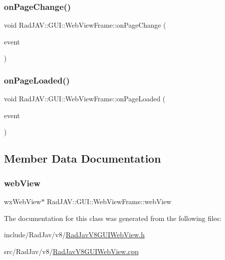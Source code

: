 \subsubsection{\texorpdfstring{on\+Page\+Change()}{onPageChange()}}
{\footnotesize\ttfamily void Rad\+J\+A\+V\+::\+G\+U\+I\+::\+Web\+View\+Frame\+::on\+Page\+Change (\begin{DoxyParamCaption}\item[{wx\+Web\+View\+Event \&}]{event }\end{DoxyParamCaption})\hspace{0.3cm}{\ttfamily [static]}}

\mbox{\label{class_rad_j_a_v_1_1_g_u_i_1_1_web_view_frame_a4794cc7deb1d0c139fb32e2284e16f01}} 
\subsubsection{\texorpdfstring{on\+Page\+Loaded()}{onPageLoaded()}}
{\footnotesize\ttfamily void Rad\+J\+A\+V\+::\+G\+U\+I\+::\+Web\+View\+Frame\+::on\+Page\+Loaded (\begin{DoxyParamCaption}\item[{wx\+Web\+View\+Event \&}]{event }\end{DoxyParamCaption})\hspace{0.3cm}{\ttfamily [static]}}



\subsection{Member Data Documentation}
\mbox{\label{class_rad_j_a_v_1_1_g_u_i_1_1_web_view_frame_a3073b6697ea6df43d448496798a43805}} 
\subsubsection{\texorpdfstring{web\+View}{webView}}
{\footnotesize\ttfamily wx\+Web\+View$\ast$ Rad\+J\+A\+V\+::\+G\+U\+I\+::\+Web\+View\+Frame\+::web\+View}



The documentation for this class was generated from the following files\+:\begin{DoxyCompactItemize}
\item 
include/\+Rad\+Jav/v8/\mbox{\hyperlink{_rad_jav_v8_g_u_i_web_view_8h}{Rad\+Jav\+V8\+G\+U\+I\+Web\+View.\+h}}\item 
src/\+Rad\+Jav/v8/\mbox{\hyperlink{_rad_jav_v8_g_u_i_web_view_8cpp}{Rad\+Jav\+V8\+G\+U\+I\+Web\+View.\+cpp}}\end{DoxyCompactItemize}
